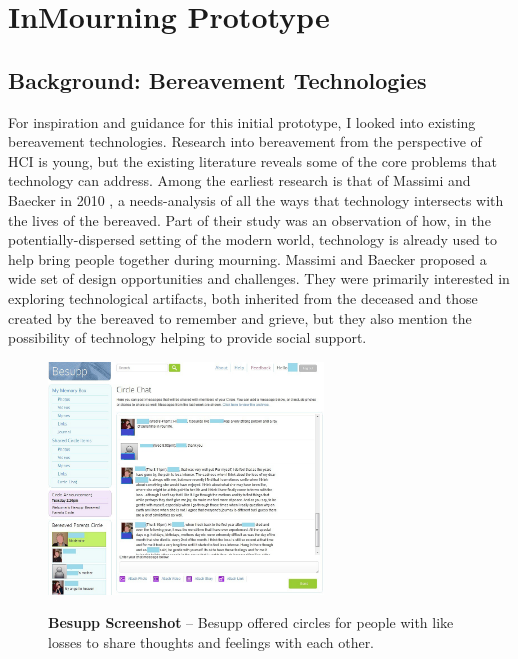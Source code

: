 \chapter{InMourning Prototype}

\section{Background: Bereavement Technologies}
  For inspiration and guidance for this initial prototype,
  I looked into existing bereavement technologies.
  Research into bereavement from the perspective of HCI is young, but the
  existing literature reveals some of the core problems that technology can
  address. Among the earliest research is that of Massimi and Baecker in 2010
  \cite{mm10},
  a needs-analysis of all the ways that technology intersects with the lives of
  the bereaved.
  Part of their study was an observation of how,
  in the potentially-dispersed setting of the modern world, 
  technology is already used to help bring people together during mourning.
  Massimi and Baecker proposed a wide set of design opportunities and challenges.
  They were primarily interested in exploring technological artifacts,
  both inherited from the deceased and those created by the bereaved to
  remember and grieve, but they also mention the possibility of technology
  helping to provide social support.

  \begin{figure}
  \caption[Screenshot from Massimi et al.\ Besupp]
  {\textbf{Besupp Screenshot} --
  Besupp offered circles for people with like losses to share thoughts
  and feelings with each other.
  }
  \centering
  \includegraphics[width=0.65\textwidth]{besupp.png}
  \label{fig:besupp}
  \end{figure}

